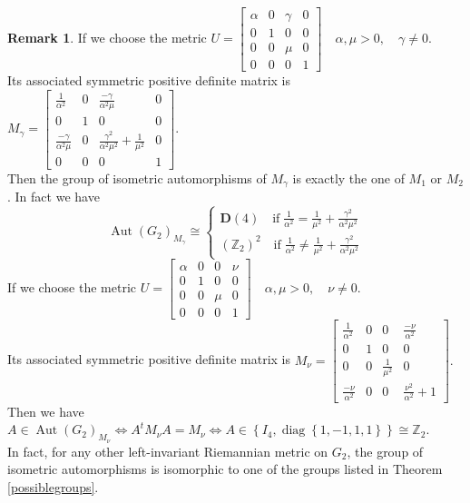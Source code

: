 \documentclass[12pt,a4paper,twoside]{article}
\theoremstyle{definition}
\newtheorem{remark}[theorem]{Remark}
\begin{document}
\begin{remark}
If we choose the metric $U = \begin{bmatrix}
\alpha & 0 & \gamma & 0\\
0 & 1 & 0 & 0\\
0 & 0 & \mu & 0\\
0 & 0 & 0 & 1
\end{bmatrix} \quad \alpha, \mu > 0, \quad \gamma \neq 0.$\\
Its associated symmetric positive definite matrix is $M_{\gamma} = \begin{bmatrix}
\frac{1}{\alpha^2} & 0 & \frac{-\gamma}{\alpha^2\mu} & 0\\
0 & 1 & 0 & 0\\
\frac{-\gamma}{\alpha^2\mu} & 0 & \frac{\gamma^2}{\alpha^2\mu^2} + \frac{1}{\mu^2} & 0\\
0 & 0 & 0 & 1
\end{bmatrix}.$\\
Then the group of isometric automorphisms of $M_{\gamma}$ is exactly the one of $M_1$ or $M_2$. In fact we have
$$\operatorname{Aut}\left(G_2\right)_{M_{\gamma}} \cong \left\lbrace\begin{array}{lll}
\mathbf{D}(4) \quad \text{if}\; \frac{1}{\alpha^2} = \frac{1}{\mu^2} + \frac{\gamma^2}{\alpha^2\mu^2} \\
\left(\mathbb{Z}_2\right)^2 \quad \text{if}\; \frac{1}{\alpha^2} \neq \frac{1}{\mu^2} + \frac{\gamma^2}{\alpha^2\mu^2}
\end{array}\right.
$$
If we choose the metric $U = \begin{bmatrix}
\alpha & 0 & 0 & \nu\\
0 & 1 & 0 & 0\\
0 & 0 & \mu & 0\\
0 & 0 & 0 & 1
\end{bmatrix} \quad \alpha, \mu > 0, \quad \nu \neq 0.$\\
Its associated symmetric positive definite matrix is $M_{\nu} = \begin{bmatrix}
\frac{1}{\alpha^2} & 0 & 0 & \frac{-\nu}{\alpha^2}\\
0 & 1 & 0 & 0\\
0 & 0 & \frac{1}{\mu^2} & 0\\
\frac{-\nu}{\alpha^2} & 0 & 0 & \frac{\nu^2}{\alpha^2} + 1
\end{bmatrix}.$\\
Then we have $A \in \operatorname{Aut}\left(G_2\right)_{M_{\nu}} \Leftrightarrow A^tM_{\nu}A = M_{\nu} \Leftrightarrow A \in \left\lbrace I_4, \operatorname{diag}\left\lbrace 1, -1, 1, 1\right\rbrace \right\rbrace \cong \mathbb{Z}_2$.\\
In fact, for any other left-invariant Riemannian metric on $G_2$, the group of isometric automorphisms is isomorphic to one of the groups listed in Theorem \ref{possiblegroups}.
\end{remark}
\end{document}
